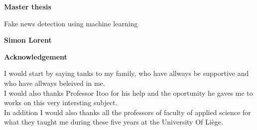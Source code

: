 \thispagestyle{plain}
\begin{center}
    \Large
    \textbf{Master thesis}
 
    \vspace{0.4cm}
    \large
    Fake news detection using machine learning
 
    \vspace{0.4cm}
    \textbf{Simon Lorent}
 
    \vspace{0.9cm}
    \textbf{Acknowledgement}

\end{center}
I would start by saying tanks to my family, who have allways be supportive and who have allways beleived in me. \\

I would also thanks Professor Itoo for his help and the oportunity he gaves me to works on this very intersting subject. \\

In addition I would also thanks all the professors of faculty of applied science for what they taught me during these five years at the University Of Li\`ege. 